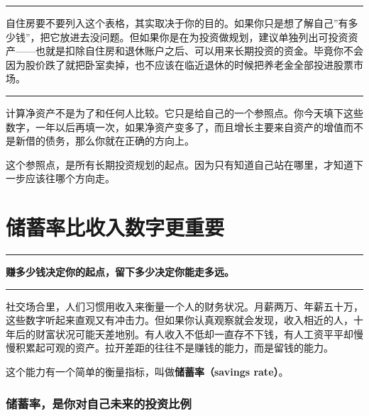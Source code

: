 \documentclass[a4paper,11pt,oneside,fontset=none,UTF8,zihao=-4]{ctexbook}
\begin{document}
\begin{center}{\color{dh-bronze}\rule{0.2\textwidth}{0.5pt}}\end{center}

自住房要不要列入这个表格，其实取决于你的目的。如果你只是想了解自己''有多少钱''，把它放进去没问题。但如果你是在为投资做规划，建议单独列出可投资资产------也就是扣除自住房和退休账户之后、可以用来长期投资的资金。毕竟你不会因为股价跌了就把卧室卖掉，也不应该在临近退休的时候把养老金全部投进股票市场。

\begin{center}{\color{dh-bronze}\rule{0.2\textwidth}{0.5pt}}\end{center}

计算净资产不是为了和任何人比较。它只是给自己的一个参照点。你今天填下这些数字，一年以后再填一次，如果净资产变多了，而且增长主要来自资产的增值而不是新借的债务，那么你就在正确的方向上。

这个参照点，是所有长期投资规划的起点。因为只有知道自己站在哪里，才知道下一步应该往哪个方向走。

\newpage

\chapter{储蓄率比收入数字更重要}\label{ux50a8ux84c4ux7387ux6bd4ux6536ux5165ux6570ux5b57ux66f4ux91cdux8981}

\begin{center}{\color{dh-bronze}\rule{0.2\textwidth}{0.5pt}}\end{center}

\begin{dhquote}
\textbf{赚多少钱决定你的起点，留下多少决定你能走多远。}
\end{dhquote}

\begin{center}{\color{dh-bronze}\rule{0.2\textwidth}{0.5pt}}\end{center}

社交场合里，人们习惯用收入来衡量一个人的财务状况。月薪两万、年薪五十万，这些数字听起来直观又有冲击力。但如果你认真观察就会发现，收入相近的人，十年后的财富状况可能天差地别。有人收入不低却一直存不下钱，有人工资平平却慢慢积累起可观的资产。拉开差距的往往不是赚钱的能力，而是留钱的能力。

这个能力有一个简单的衡量指标，叫做\textbf{储蓄率（savings rate）}。

\subsection{储蓄率，是你对自己未来的投资比例}\label{ux50a8ux84c4ux7387ux662fux4f60ux5bf9ux81eaux5df1ux672aux6765ux7684ux6295ux8d44ux6bd4ux4f8b}
\end{document}
